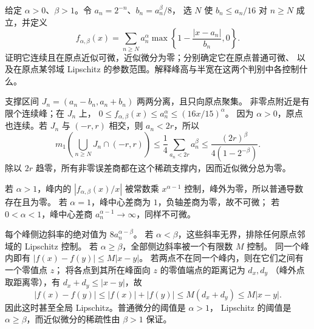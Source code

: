 \begin{exercise}\label{b1:ex:16-approximate-not-ordinary}
给定 \(\alpha>0\)、\(\beta>1\)。令 \(a_n=2^{-n}\)、\(b_n=a_n^\beta/8\)，
选 \(N\) 使 \(b_n\le a_n/16\) 对 \(n\ge N\) 成立，并定义
\[
 f_{\alpha,\beta}(x)=\sum_{n\ge N}
 a_n^\alpha\max\left\{1-\frac{|x-a_n|}{b_n},0\right\}.
\]
证明它连续且在原点近似可微，近似微分为零；分别确定它在原点普通可微、
以及在原点某邻域 Lipschitz 的参数范围。解释峰高与半宽在这两个判别中各控制什么。
\end{exercise}
\begin{solution}
支撑区间 \(J_n=(a_n-b_n,a_n+b_n)\) 两两分离，且只向原点聚集。
非零点附近是有限个连续峰；在 \(J_n\) 上，
\(0\le f_{\alpha,\beta}(x)\le a_n^\alpha\le(16x/15)^\alpha\)。
因为 \(\alpha>0\)，原点也连续。若 \(J_n\) 与 \((-r,r)\) 相交，则 \(a_n<2r\)，所以
\[
 m_1\left(\bigcup_{n\ge N}J_n\cap(-r,r)\right)
 \le\frac14\sum_{a_n<2r}a_n^\beta
 \le\frac{(2r)^\beta}{4(1-2^{-\beta})}.
\]
除以 \(2r\) 趋零，所有非零误差商都在这个稀疏支撑内，因而近似微分总为零。

若 \(\alpha>1\)，峰内的 \(|f_{\alpha,\beta}(x)/x|\) 被常数乘
\(x^{\alpha-1}\) 控制，峰外为零，所以普通导数存在且为零。
若 \(\alpha=1\)，峰中心差商为 \(1\)，负轴差商为零，故不可微；
若 \(0<\alpha<1\)，峰中心差商 \(a_n^{\alpha-1}\to\infty\)，同样不可微。

每个峰侧边斜率的绝对值为 \(8a_n^{\alpha-\beta}\)。
若 \(\alpha<\beta\)，这些斜率无界，排除任何原点邻域的 Lipschitz 控制。
若 \(\alpha\ge\beta\)，全部侧边斜率被一个有限数 \(M\) 控制。
同一个峰内即有 \(|f(x)-f(y)|\le M|x-y|\)。
若两点不在同一个峰内，则在它们之间有一个零值点 \(z\)；
将各点到其所在峰面向 \(z\) 的零值端点的距离记为 \(d_x,d_y\)
（峰外点取距离零），有 \(d_x+d_y\le|x-y|\)，故
\[
 |f(x)-f(y)|\le |f(x)|+|f(y)|\le M(d_x+d_y)\le M|x-y|.
\]
因此这时甚至全局 Lipschitz。普通微分的阈值是 \(\alpha>1\)，
Lipschitz 的阈值是 \(\alpha\ge\beta\)，而近似微分的稀疏性由 \(\beta>1\) 保证。
\end{solution}

